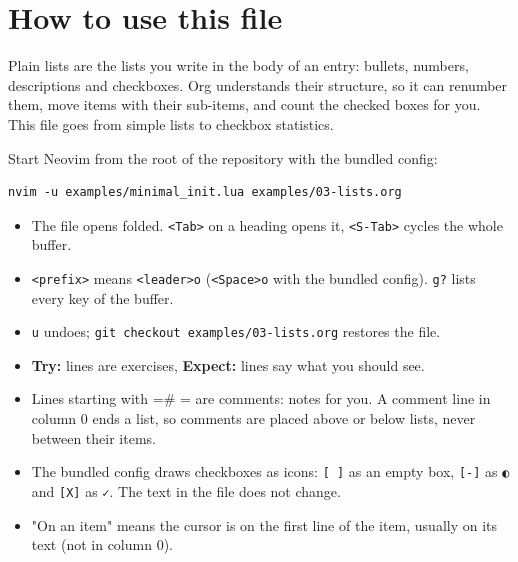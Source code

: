 \section{How to use this file}
\label{sec:org2872d7b}
Plain lists are the lists you write in the body of an entry: bullets,
numbers, descriptions and checkboxes. Org understands their structure, so
it can renumber them, move items with their sub-items, and count the
checked boxes for you. This file goes from simple lists to checkbox
statistics.

Start Neovim from the root of the repository with the bundled config:

\begin{verbatim}
nvim -u examples/minimal_init.lua examples/03-lists.org
\end{verbatim}

\begin{itemize}
\item The file opens folded. \texttt{<Tab>} on a heading opens it, \texttt{<S-Tab>} cycles
the whole buffer.
\item \texttt{<prefix>} means \texttt{<leader>o} (\texttt{<Space>o} with the bundled config). \texttt{g?}
lists every key of the buffer.
\item \texttt{u} undoes; \texttt{git checkout examples/03-lists.org} restores the file.
\item \textbf{Try:} lines are exercises, \textbf{Expect:} lines say what you should see.
\item Lines starting with =\# = are comments: notes for you. A comment line in
column 0 ends a list, so comments are placed above or below lists, never
between their items.
\item The bundled config draws checkboxes as icons: \texttt{[ ]} as an empty box,
\texttt{[-]} as \texttt{◐} and \texttt{[X]} as \texttt{✓}. The text in the file does not change.
\item "On an item" means the cursor is on the first line of the item, usually
on its text (not in column 0).
\end{itemize}
